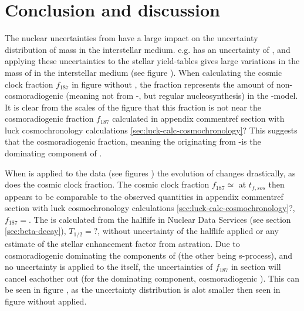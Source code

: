 \chapter{Conclusion and discussion}
\label{sec:conclusion}

The nuclear uncertainties from  have a large impact on the uncertainty distribution of mass in the interstellar medium. e.g.  has an uncertainty of , and applying these uncertainties to the stellar yield-tables gives large variations in the mass of  in the interstellar medium (see figure ).
When calculating the cosmic clock fraction $f_{187}$ in figure  without \betadecay, the fraction represents the amount of non-cosmoradiogenic  (meaning not from -\betadecay, but regular nucleosynthesis) in the \omegamodel-model.
It is clear from the scales of the figure that this fraction is not near the cosmoradiogenic fraction $f_{187}$ calculated in appendix comment{ref section with luck cosmochronology calculations \ref{sec:luck-calc-cosmochronology}?}
This suggests that the cosmoradiogenic fraction, meaning the  originating from -\betadecay is the dominating component of .

When \betadecay is applied to the data (see figures ) the evolution of  changes drastically, as does the cosmic clock fraction. The cosmic clock fraction $f_{187}\simeq$ at $t_{f,sos}$ then appears to be comparable to the observed quantities in appendix comment{ref section with luck cosmochronology calculations \ref{sec:luck-calc-cosmochronology}?}, $f_{187}=$.
The \betadecay is calculated from the halflife in Nuclear Data Services (see section \ref{sec:beta-decay}), $T_{1/2}=?$, without uncertainty of the halflife applied or any estimate of the stellar enhancement factor from astration.
Due to cosmoradiogenic  dominating the components of  (the other being s-process), and no uncertainty is applied to the \betadecay itself, the uncertainties of $f_{187}$ in section  will cancel eachother out (for the dominating component, cosmoradiogenic ).
This can be seen in figure , as the uncertainty distribution is alot smaller then seen in figure  without \betadecay applied.

